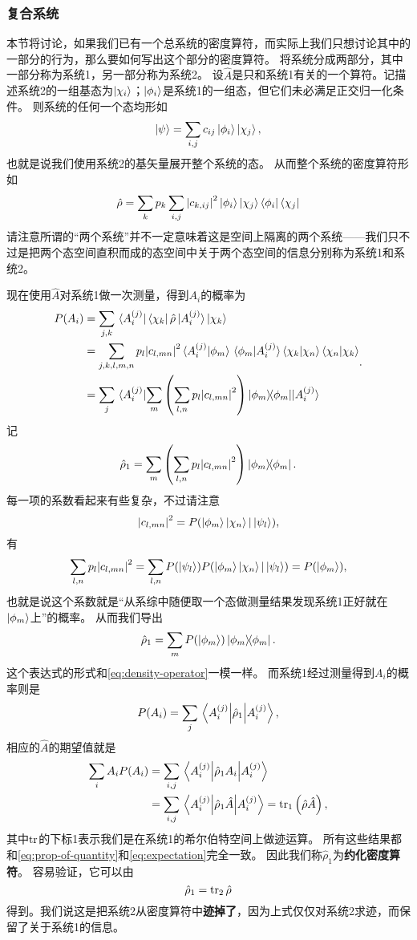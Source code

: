 \documentclass[hyperref, UTF8, a4paper]{ctexart}
\begin{document}
\subsubsection{复合系统}\label{sec:combining-systems}

本节将讨论，如果我们已有一个总系统的密度算符，而实际上我们只想讨论其中的一部分的行为，那么要如何写出这个部分的密度算符。
将系统分成两部分，其中一部分称为系统1，另一部分称为系统2。
设$\hat{A}$是只和系统1有关的一个算符。记描述系统2的一组基态为$\ket{\chi_i}$；$\ket{\phi_i}$是系统1的一组态，但它们未必满足正交归一化条件。
则系统的任何一个态均形如
\[
    \ket{\psi} = \sum_{i, j} c_{ij} \ket{\phi_i} \ket{\chi_j},
\]
也就是说我们使用系统2的基矢量展开整个系统的态。
从而整个系统的密度算符形如
\[
    \hat{\rho} = \sum_k p_k \sum_{i,j} \abs{c_{k,ij}}^2 \ket{\phi_i} \ket{\chi_j} \bra{\phi_i} \bra{\chi_j}
\]
请注意所谓的“两个系统”并不一定意味着这是空间上隔离的两个系统——我们只不过是把两个态空间直积而成的态空间中关于两个态空间的信息分别称为系统1和系统2。

现在使用$\hat{A}$对系统1做一次测量，得到$A_i$的概率为
\[
    \begin{aligned}
        P(A_i) &= \sum_{j, k} \bra*{A^{(j)}_i} \bra{\chi_k} \hat{\rho} \ket*{A^{(j)}_i} \ket{\chi_k} \\
        &= \sum_{j, k, l, m, n} p_l \abs{c_{l, mn}}^2 \braket*{A_i^{(j)}}{\phi_m} \braket*{\phi_m}{A_i^{(j)}} \braket{\chi_k}{\chi_n} \braket{\chi_n}{\chi_k} \\
        &= \sum_j \mel*{A_i^{(j)}}{\sum_m \left(\sum_{l, n} p_l \abs{c_{l, mn}}^2 \right) \dyad{\phi_m}}{A_i^{(j)}} 
    \end{aligned}.
\]
记
\[
    \hat{\rho}_1 = \sum_m \left(\sum_{l, n} p_l \abs{c_{l, mn}}^2 \right) \dyad{\phi_m}.
\]
每一项的系数看起来有些复杂，不过请注意
\[
    \abs{c_{l, mn}}^2 = P(\ket{\phi_m} \ket{\chi_n} | \ket{\psi_l}),
\]
有
\[
    \sum_{l, n} p_l \abs{c_{l, mn}}^2 = \sum_{l, n} P(\ket{\psi_l}) P(\ket{\phi_m} \ket{\chi_n} | \ket{\psi_l}) = P(\ket{\phi_m}),
\]
也就是说这个系数就是“从系综中随便取一个态做测量结果发现系统1正好就在$\ket{\phi_m}$上”的概率。
从而我们导出
\[
    \hat{\rho}_1 = \sum_m P(\ket{\phi_m}) \dyad{\phi_m}.
\]
这个表达式的形式和\eqref{eq:density-operator}一模一样。
而系统1经过测量得到$A_i$的概率则是
\[
    P(A_i) = \sum_j \mel{A^{(j)}_i}{\hat{\rho}_1}{A^{(j)}_i},
\]
相应的$\hat{A}$的期望值就是
\[
    \begin{aligned}
        \sum_i A_i P(A_i) &= \sum_{i, j} \mel{A^{(j)}_i}{\hat{\rho}_1 A_i}{A^{(j)}_i} \\
        &= \sum_{i, j} \mel{A^{(j)}_i}{\hat{\rho}_1 \hat{A}}{A^{(j)}_i} = \trace_1 \left(\hat{\rho}\hat{A}\right),
    \end{aligned}
\]
其中$\trace$的下标1表示我们是在系统1的希尔伯特空间上做迹运算。
所有这些结果都和\eqref{eq:prop-of-quantity}和\eqref{eq:expectation}完全一致。
因此我们称$\hat{\rho}_1$为\textbf{约化密度算符}。
容易验证，它可以由
\begin{equation}
    \hat{\rho}_1 = \trace_2 \hat{\rho}
\end{equation}
得到。我们说这是把系统2从密度算符中\textbf{迹掉了}，因为上式仅仅对系统2求迹，而保留了关于系统1的信息。
\end{document}
